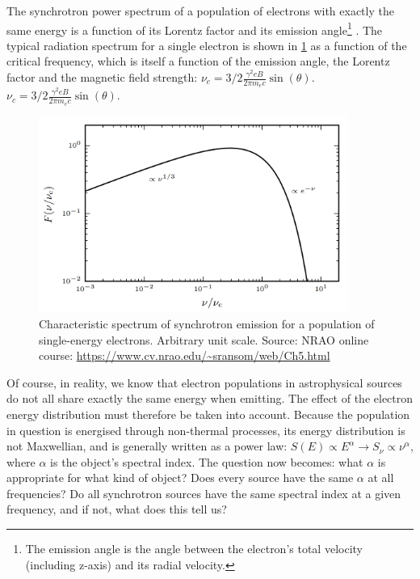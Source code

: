 \pg
The synchrotron power spectrum of a population of electrons with exactly the same energy is a function of its Lorentz factor and its emission angle\footnote{The emission angle is the angle between the electron's total velocity (including z-axis) and its radial velocity.} . The typical radiation spectrum for a single electron is shown in \cref{fig.synchrotron.1electrion} as a function of the critical frequency, which is itself a function of the emission angle, the Lorentz factor and the magnetic field strength: $\nu_c=3/2\frac{\gamma^2 e B}{2\pi m_e c}\sin(\theta)$.
$\nu_c=3/2\frac{\gamma^2 e B}{2\pi m_e c}\sin(\theta)$.
\begin{figure}[!h]
\centering
\includegraphics[width=0.9\textwidth]{images/Synchrotron-single-electron.png}
\caption{\label{fig.synchrotron.1electrion} Characteristic spectrum of synchrotron emission for a population of single-energy electrons. Arbitrary unit scale. Source: NRAO online course: \url{https://www.cv.nrao.edu/~sransom/web/Ch5.html}}
\end{figure}

\pg
Of course, in reality, we know that electron populations in astrophysical sources do not all share exactly the same energy when emitting. The effect of the electron energy distribution must therefore be taken into account. Because the population in question is energised through non-thermal processes, its energy distribution is not Maxwellian, and is generally written as a power law: $S(E) \propto E^\alpha \rightarrow S_\nu \propto \nu^{\alpha}$, where $\alpha$ is the object's spectral index.
The question now becomes: what $\alpha$ is appropriate for what kind of object? Does every source have the same $\alpha$ at all frequencies? Do all synchrotron sources have the same spectral index at a given frequency, and if not, what does this tell us?

